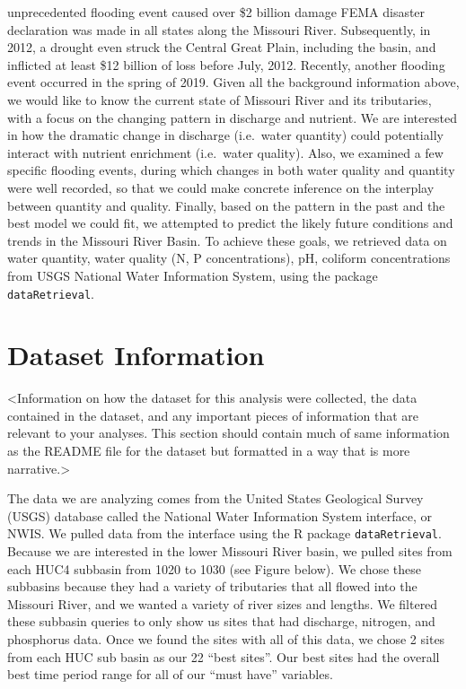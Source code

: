 \documentclass[12pt,]{article}
\begin{document}
unprecedented flooding event caused over \$2 billion damage FEMA
disaster declaration was made in all states along the Missouri River.
Subsequently, in 2012, a drought even struck the Central Great Plain,
including the basin, and inflicted at least \$12 billion of loss before
July, 2012. Recently, another flooding event occurred in the spring of
2019. Given all the background information above, we would like to know
the current state of Missouri River and its tributaries, with a focus on
the changing pattern in discharge and nutrient. We are interested in how
the dramatic change in discharge (i.e.~water quantity) could potentially
interact with nutrient enrichment (i.e.~water quality). Also, we
examined a few specific flooding events, during which changes in both
water quality and quantity were well recorded, so that we could make
concrete inference on the interplay between quantity and quality.
Finally, based on the pattern in the past and the best model we could
fit, we attempted to predict the likely future conditions and trends in
the Missouri River Basin. To achieve these goals, we retrieved data on
water quantity, water quality (N, P concentrations), pH, coliform
concentrations from USGS National Water Information System, using the
package \texttt{dataRetrieval}.

\newpage

\hypertarget{dataset-information}{%
\section{Dataset Information}\label{dataset-information}}

\textless Information on how the dataset for this analysis were
collected, the data contained in the dataset, and any important pieces
of information that are relevant to your analyses. This section should
contain much of same information as the README file for the dataset but
formatted in a way that is more narrative.\textgreater{}

The data we are analyzing comes from the United States Geological Survey
(USGS) database called the National Water Information System interface,
or NWIS. We pulled data from the interface using the R package
\texttt{dataRetrieval}. Because we are interested in the lower Missouri
River basin, we pulled sites from each HUC4 subbasin from 1020 to 1030
(see Figure below). We chose these subbasins because they had a variety
of tributaries that all flowed into the Missouri River, and we wanted a
variety of river sizes and lengths. We filtered these subbasin queries
to only show us sites that had discharge, nitrogen, and phosphorus data.
Once we found the sites with all of this data, we chose 2 sites from
each HUC sub basin as our 22 ``best sites''. Our best sites had the
overall best time period range for all of our ``must have'' variables.
\end{document}
